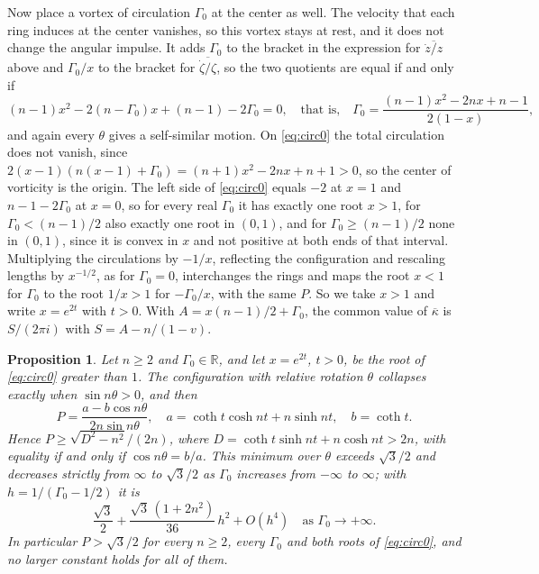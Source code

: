 \documentclass[11pt]{article}
\newtheorem{proposition}{Proposition}
\theoremstyle{definition}
\begin{document}
Now place a vortex of circulation $\Gamma_0$ at the center as well. The velocity that each ring induces at the center vanishes, so this vortex stays at rest, and it does not change the angular impulse. It adds $\Gamma_0$ to the bracket in the expression for $\overline{\dot z/z}$ above and $\Gamma_0/x$ to the bracket for $\overline{\dot\zeta/\zeta}$, so the two quotients are equal if and only if
\begin{equation}\label{eq:circ0}
  (n - 1)x^2 - 2(n - \Gamma_0)x + (n - 1) - 2\Gamma_0 = 0, \quad\text{that is,}\quad \Gamma_0 = \frac{(n - 1)x^2 - 2nx + n - 1}{2(1 - x)},
\end{equation}
and again every $\theta$ gives a self-similar motion. On \eqref{eq:circ0} the total circulation does not vanish, since $2(x - 1)(n(x - 1) + \Gamma_0) = (n + 1)x^2 - 2nx + n + 1 > 0$, so the center of vorticity is the origin. The left side of \eqref{eq:circ0} equals $-2$ at $x = 1$ and $n - 1 - 2\Gamma_0$ at $x = 0$, so for every real $\Gamma_0$ it has exactly one root $x > 1$, for $\Gamma_0 < (n - 1)/2$ also exactly one root in $(0, 1)$, and for $\Gamma_0 \ge (n - 1)/2$ none in $(0, 1)$, since it is convex in $x$ and not positive at both ends of that interval. Multiplying the circulations by $-1/x$, reflecting the configuration and rescaling lengths by $x^{-1/2}$, as for $\Gamma_0 = 0$, interchanges the rings and maps the root $x < 1$ for $\Gamma_0$ to the root $1/x > 1$ for $-\Gamma_0/x$, with the same $P$. So we take $x > 1$ and write $x = e^{2t}$ with $t > 0$. With $A = x(n - 1)/2 + \Gamma_0$, the common value of $\overline{\kappa}$ is $S/(2\pi i)$ with $S = A - n/(1 - v)$.

\begin{proposition}\label{prop:centre}
Let $n \ge 2$ and $\Gamma_0 \in \mathbb{R}$, and let $x = e^{2t}$, $t > 0$, be the root of \eqref{eq:circ0} greater than $1$. The configuration with relative rotation $\theta$ collapses exactly when $\sin n\theta > 0$, and then
\begin{equation}\label{eq:Pcentre}
  P = \frac{a - b\cos n\theta}{2n\sin n\theta}, \quad a = \coth t\cosh nt + n\sinh nt, \quad b = \coth t .
\end{equation}
Hence $P \ge \sqrt{D^2 - n^2}/(2n)$, where $D = \coth t\sinh nt + n\cosh nt > 2n$, with equality if and only if $\cos n\theta = b/a$. This minimum over $\theta$ exceeds $\sqrt{3}/2$ and decreases strictly from $\infty$ to $\sqrt{3}/2$ as $\Gamma_0$ increases from $-\infty$ to $\infty$; with $h = 1/(\Gamma_0 - 1/2)$ it is
\[
  \frac{\sqrt{3}}{2} + \frac{\sqrt{3}\,(1 + 2n^2)}{36}\,h^2 + O(h^4) \quad \text{as } \Gamma_0 \to +\infty.
\]
In particular $P > \sqrt{3}/2$ for every $n \ge 2$, every $\Gamma_0$ and both roots of \eqref{eq:circ0}, and no larger constant holds for all of them.
\end{proposition}
\end{document}
